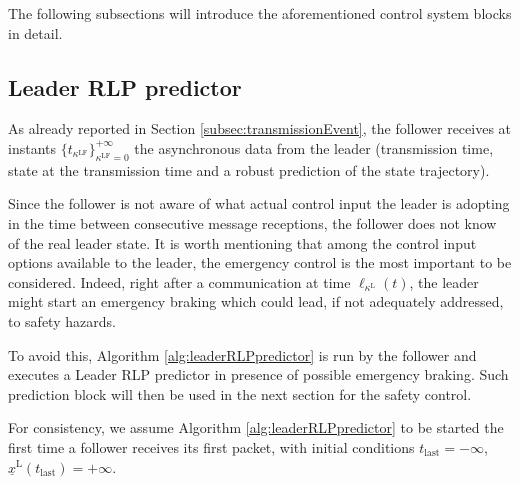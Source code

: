 \documentclass[letterpaper, 10 pt, conference]{ieeeconf}
\theoremstyle{definition}
\theoremstyle{nopoint}
\begin{document}
The following subsections will introduce the aforementioned control system blocks in detail. 




  
\subsection{Leader RLP predictor}
 \label{subsec:leaderRLPpredictor}

As  already reported in Section \ref{subsec:transmissionEvent}, the follower receives at instants \(\{ t_{\kappa^\mathrm{LF}} \}_{\kappa^\mathrm{LF}=0}^{+\infty}\)
the asynchronous data from the leader (transmission time, state at the transmission time and a robust prediction of the state trajectory). 


Since the follower is not aware of what  actual control input  the leader is adopting in the time between consecutive message receptions, the follower does not know of the real leader state. It is worth mentioning that among the control input options available to the leader, the emergency control is the most important to be considered. Indeed, right after a communication at time $\ell_{\kappa^\mathrm{L}}(t)$, the leader might start an emergency braking which could lead, if not adequately addressed, to safety hazards. 

To avoid this,  Algorithm \ref{alg:leaderRLPpredictor} is run by the follower and executes a Leader RLP predictor in presence of possible emergency braking. Such prediction block will then be used in the next section for the safety control.

For consistency, we assume Algorithm \ref{alg:leaderRLPpredictor} to be started the first time a follower receives its first packet, with initial conditions $t_{\mathrm{last}}=-\infty$, $\underline{x}^\mathrm{L}(t_{\mathrm{last}})=+\infty$.
\end{document}
